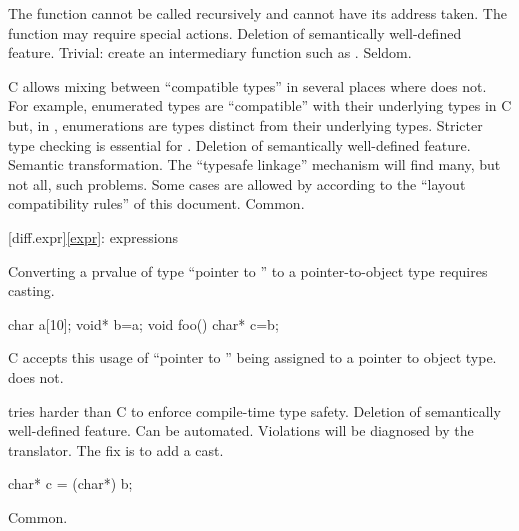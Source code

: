 \change
The  function cannot be called recursively and cannot have its address taken.
\rationale
The  function may require special actions.
\effect
Deletion of semantically well-defined feature.
\difficulty
Trivial: create an intermediary function such as
.
\howwide
Seldom.

\change
C allows mixing between ``compatible types'' in several places where \Cpp{} does not.\\
For example,
enumerated types are ``compatible'' with their underlying types in C but, in \Cpp{},
enumerations are types distinct from their underlying types.
\rationale
Stricter type checking is essential for \Cpp{}.
\effect
Deletion of semantically well-defined feature.
\difficulty
Semantic transformation.
The ``typesafe linkage'' mechanism will find many, but not all,
such problems.
Some cases are allowed by \Cpp{}
according to the ``layout compatibility rules'' of this
document.
\howwide
Common.

[diff.expr]{\ref*{expr}: expressions}

\change
Converting a prvalue of type ``pointer to \cv{} ''
to a pointer-to-object type requires casting.
\begin{example}
\begin{codeblock}
char a[10];
void* b=a;
void foo() {
  char* c=b;
}
\end{codeblock}

C accepts this usage of ``pointer to '' being assigned
to a pointer to object type.
\Cpp{} does not.
\end{example}
\rationale
\Cpp{} tries harder than C to enforce compile-time type safety.
\effect
Deletion of semantically well-defined feature.
\difficulty
Can be automated.
Violations will be diagnosed by the \Cpp{} translator.
The fix is to add a  cast.
\begin{example}
\begin{codeblock}
char* c = (char*) b;
\end{codeblock}
\end{example}

\howwide
Common.

